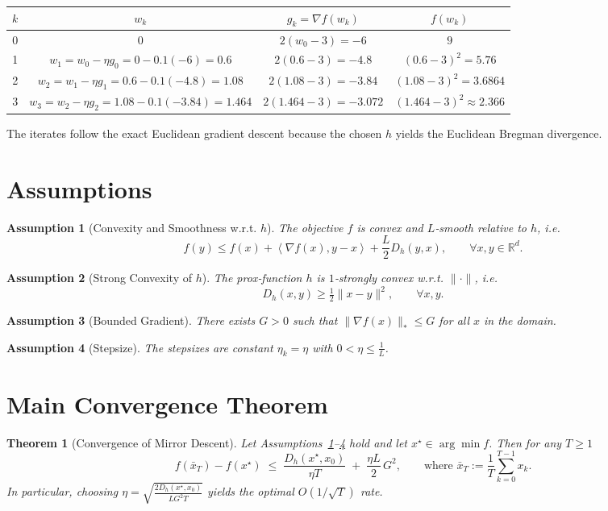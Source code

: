 \documentclass[11pt]{article}
\newtheorem{theorem}{Theorem}
\newtheorem{assumption}{Assumption}
\newcommand{\inner}[2]{\left\langle #1,#2\right\rangle}
\newcommand{\Breg}[2]{D_{h}(#1,#2)}
\newcommand{\grad}{\nabla}
\begin{document}
\begin{center}
\begin{tabular}{c|c|c|c}
$k$ & $w_k$ & $g_k=\grad f(w_k)$ & $f(w_k)$\\ \hline
0 & $0$ & $2(w_0-3)=-6$ & $9$\\
1 & $w_1=w_0-\eta g_0=0-0.1(-6)=0.6$ & $2(0.6-3)=-4.8$ & $(0.6-3)^2=5.76$\\
2 & $w_2=w_1-\eta g_1=0.6-0.1(-4.8)=1.08$ & $2(1.08-3)=-3.84$ & $(1.08-3)^2=3.6864$\\
3 & $w_3=w_2-\eta g_2=1.08-0.1(-3.84)=1.464$ & $2(1.464-3)=-3.072$ & $(1.464-3)^2\approx2.366$\\
\end{tabular}
\end{center}
The iterates follow the exact Euclidean gradient descent because the chosen $h$ yields the Euclidean Bregman divergence.

\newpage
\section*{Assumptions}
\begin{assumption}[Convexity and Smoothness w.r.t. $h$]
\label{as:convex}
The objective $f$ is convex and $L$‑smooth relative to $h$, i.e.
\[
f(y)\le f(x)+\inner{\grad f(x)}{y-x}+\frac{L}{2}\Breg{y}{x},
\qquad\forall x,y\in\mathbb{R}^{d}.
\]
\end{assumption}
\begin{assumption}[Strong Convexity of $h$]
\label{as:hstrong}
The prox‑function $h$ is $1$‑strongly convex w.r.t. $\|\cdot\|$, i.e.
\[
\Breg{x}{y}\ge \tfrac12\|x-y\|^{2},\qquad\forall x,y.
\]
\end{assumption}
\begin{assumption}[Bounded Gradient]
\label{as:gradbound}
There exists $G>0$ such that $\|\grad f(x)\|_{*}\le G$ for all $x$ in the domain.
\end{assumption}
\begin{assumption}[Stepsize]
\label{as:stepsize}
The stepsizes are constant $\eta_k=\eta$ with $0<\eta\le \tfrac{1}{L}$.
\end{assumption}

\section*{Main Convergence Theorem}
\begin{theorem}[Convergence of Mirror Descent]
\label{thm:md}
Let Assumptions~\ref{as:convex}--\ref{as:stepsize} hold and let $x^{\star}\in\arg\min f$. Then for any $T\ge1$
\[
f(\bar{x}_T)-f(x^{\star})\;\le\;
\frac{\Breg{x^{\star}}{x_0}}{\eta T}
\;+\;\frac{\eta L}{2}\,G^{2},
\qquad\text{where }\bar{x}_T:=\frac{1}{T}\sum_{k=0}^{T-1}x_k.
\]
In particular, choosing $\eta=\sqrt{\frac{2\Breg{x^{\star}}{x_0}}{L G^{2}T}}$ yields the optimal $O(1/\sqrt{T})$ rate.
\end{theorem}
\end{document}
